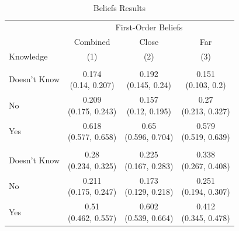 \documentclass[
]{article}
\begin{document}
\begin{table}
\centering
\caption{\label{tab:unnamed-chunk-14}Beliefs Results}
\centering
\begin{tabular}[t]{lccc}
\toprule
\multicolumn{1}{c}{ } & \multicolumn{3}{c}{First-Order Beliefs} \\
\cmidrule(l{3pt}r{3pt}){2-4}
\multicolumn{1}{c}{ } & \multicolumn{1}{c}{Combined} & \multicolumn{1}{c}{Close} & \multicolumn{1}{c}{Far} \\
Knowledge & (1) & (2) & (3)\\
\midrule
\addlinespace[0.3em]
\hline
\multicolumn{4}{l}{\textbf{Bracelet}}\\
\hline
\hspace{1em}Doesn't Know & \makecell[c]{0.174\\(0.14, 0.207)} & \makecell[c]{0.192\\(0.145, 0.24)} & \makecell[c]{0.151\\(0.103, 0.2)}\\
\hspace{1em}No & \makecell[c]{0.209\\(0.175, 0.243)} & \makecell[c]{0.157\\(0.12, 0.195)} & \makecell[c]{0.27\\(0.213, 0.327)}\\
\hspace{1em}Yes & \makecell[c]{0.618\\(0.577, 0.658)} & \makecell[c]{0.65\\(0.596, 0.704)} & \makecell[c]{0.579\\(0.519, 0.639)}\\
\addlinespace[0.3em]
\hline
\multicolumn{4}{l}{\textbf{Calendar}}\\
\hline
\hspace{1em}Doesn't Know & \makecell[c]{0.28\\(0.234, 0.325)} & \makecell[c]{0.225\\(0.167, 0.283)} & \makecell[c]{0.338\\(0.267, 0.408)}\\
\hspace{1em}No & \makecell[c]{0.211\\(0.175, 0.247)} & \makecell[c]{0.173\\(0.129, 0.218)} & \makecell[c]{0.251\\(0.194, 0.307)}\\
\hspace{1em}Yes & \makecell[c]{0.51\\(0.462, 0.557)} & \makecell[c]{0.602\\(0.539, 0.664)} & \makecell[c]{0.412\\(0.345, 0.478)}\\

\end{tabular}
\end{table}
\end{document}
